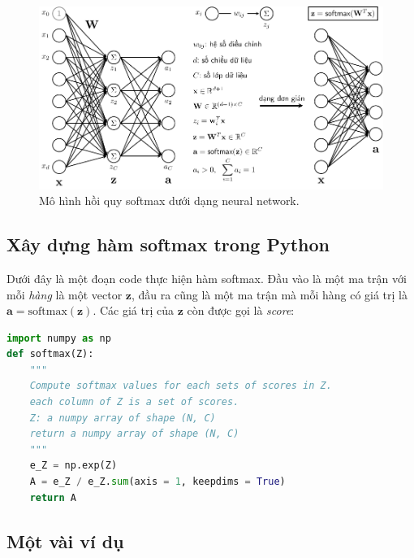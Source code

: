 \begin{figure}[t]
\centering
    \includegraphics[width =
    .9\textwidth]{Chapters/05_NeuralNetworks/13_softmax/latex/softmax_nn.pdf}
    \caption[]{Mô hình hồi quy softmax dưới dạng neural network.}
    \label{fig:13_2}
\end{figure}

 
 
 
 
\subsection{Xây dựng hàm softmax trong Python }
Dưới đây là một đoạn code thực hiện hàm softmax. Đầu vào là một ma trận với mỗi
\textit{hàng} là một vector $\mathbf{z}$, đầu ra cũng là một ma trận mà mỗi hàng có
giá
trị là $\mathbf{a} = \text{softmax}(\mathbf{z})$. Các giá trị của $\mathbf{z}$ còn được gọi là \textit{score}:
 
\begin{lstlisting}[language=Python]
import numpy as np  
def softmax(Z):
    """
    Compute softmax values for each sets of scores in Z.
    each column of Z is a set of scores.    
    Z: a numpy array of shape (N, C)
    return a numpy array of shape (N, C)
    """
    e_Z = np.exp(Z)
    A = e_Z / e_Z.sum(axis = 1, keepdims = True)
    return A
\end{lstlisting}
 
 
\subsection{Một vài ví dụ }
 
